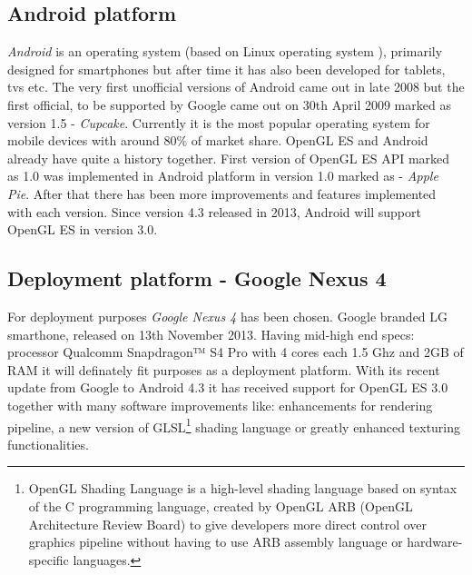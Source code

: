 \subsection{Android platform}
\emph{Android} \cite{androidcom} is an operating system (based on Linux operating system \cite{gnulinux}), primarily designed for smartphones but after time it has also been developed for tablets, tvs etc.
The very first unofficial versions of Android came out in late 2008 but the first official, to be supported by Google came out on 30th April 2009 marked as version 1.5 - \emph{Cupcake}.
\newline Currently it is the most popular operating system for mobile devices with around 80\% of market share.
OpenGL ES and Android already have quite a history together.
First version of OpenGL ES API marked as 1.0 was implemented in Android platform in version 1.0 marked as - \emph{Apple Pie}.
After that there has been more improvements and features implemented with each version.
Since version 4.3 released in 2013, Android will support OpenGL ES in version 3.0.

\subsection{Deployment platform - Google Nexus 4}
For deployment purposes \emph{Google Nexus 4} has been chosen.
Google branded LG smarthone, released on 13th November 2013.
\newline Having mid-high end specs: processor Qualcomm Snapdragon™ S4 Pro with 4 cores each 1.5 Ghz and 2GB of RAM it will definately fit purposes as a deployment platform.
\newline With its recent update from Google to Android 4.3 it has received support for OpenGL ES 3.0 together with many software improvements like: enhancements for rendering pipeline, a new version of GLSL\footnote{OpenGL Shading Language is a high-level shading language based on syntax of the C programming language, created by OpenGL ARB (OpenGL Architecture Review Board) to give developers more direct control over graphics pipeline without having to use ARB assembly language or hardware-specific languages.} shading language or greatly enhanced texturing functionalities.